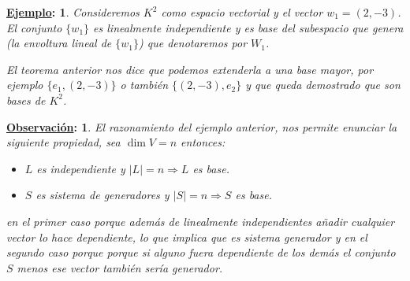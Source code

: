 \documentclass[10pt,a4paper,openright]{book}
\theoremstyle{break}
\newtheorem*{obs}{\underline{Observación}:}
\newtheorem*{ej}{\underline{Ejemplo}:}
\begin{document}
\begin{ej}
Consideremos $K^2$ como espacio vectorial y el vector $w_1=(2,-3)$. El conjunto $\{w_1\}$ es linealmente independiente y es base del subespacio que genera (la envoltura lineal de $\{w_1\}$) que denotaremos por $W_1$.

El teorema anterior nos dice que podemos extenderla a una base mayor, por ejemplo $\{e_1,(2,-3)\}$ o también $\{(2,-3), e_2\}$ y que queda demostrado que son bases de $K^2$.
\end{ej}
\begin{obs}
El razonamiento del ejemplo anterior, nos permite enunciar la siguiente propiedad, sea $\dim V=n$ entonces:
\begin{itemize}
\item $L$ es independiente y $|L|=n \Rightarrow L$ es base.
\item $S$ es sistema de generadores y $|S|=n\Rightarrow S $ es base. 
\end{itemize}
en el primer caso porque además de linealmente independientes añadir cualquier vector lo hace dependiente, lo que implica que es sistema generador y en el segundo caso porque porque si alguno fuera dependiente de los demás el conjunto $S$ menos ese vector también sería generador.
\end{obs}
\end{document}
